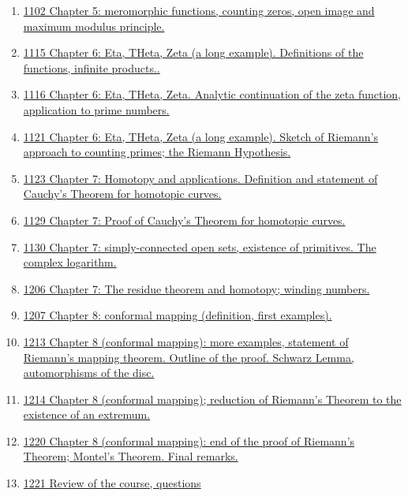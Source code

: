 \documentclass[11pt]{article}
\begin{document}
\begin{enumerate}
	\item \href{https://mp.weixin.qq.com/s/aFH-zaRn0azUI3CNPgEuQQ}{1102 Chapter 5: meromorphic functions, counting zeros, open image and maximum modulus principle.}	%
	\item \href{https://mp.weixin.qq.com/s/ZuEq6dt8PEbDHltJNAzlbg}{1115 Chapter 6: Eta, THeta, Zeta (a long example). Definitions of the functions, infinite products..}	%
	\item \href{https://mp.weixin.qq.com/s/nuNMmU-BuJDk5XAMP79Lig}{1116 Chapter 6: Eta, THeta, Zeta. Analytic continuation of the zeta function, application to prime numbers.}	%
	\item \href{https://mp.weixin.qq.com/s/WstldXh3U6M8XhSn-5lBGw}{1121 Chapter 6: Eta, THeta, Zeta (a long example). Sketch of Riemann's approach to counting primes; the Riemann Hypothesis.}	%
	\item \href{https://mp.weixin.qq.com/s/YR5GTfxuLrgHn_YMLweBKA}{1123 Chapter 7: Homotopy and applications. Definition and statement of Cauchy's Theorem for homotopic curves.}	%
	\item \href{https://mp.weixin.qq.com/s/2ITdXmiyfllA85h23RZdxg}{1129 Chapter 7: Proof of Cauchy's Theorem for homotopic curves.}	%
	\item \href{https://mp.weixin.qq.com/s/A9wQpp5YaIN_gIXFlcImdg}{1130 Chapter 7: simply-connected open sets, existence of primitives. The complex logarithm.}	%
	\item \href{https://mp.weixin.qq.com/s/QqsGD_ZDWPirzHfrX-GnrA}{1206 Chapter 7: The residue theorem and homotopy; winding numbers.}	%
	\item \href{https://mp.weixin.qq.com/s/HW9jjGv1vyn-mBE-LSd_jw}{1207 Chapter 8: conformal mapping (definition, first examples).}	%
	\item \href{https://mp.weixin.qq.com/s/dev3XnxlHSZZdNvpwEb-8g}{1213 Chapter 8 (conformal mapping): more examples, statement of Riemann's mapping theorem. Outline of the proof. Schwarz Lemma, automorphisms of the disc.}	%
	\item \href{https://mp.weixin.qq.com/s/NlzF36to98_gfQoRRlIKzw}{1214 Chapter 8 (conformal mapping); reduction of Riemann's Theorem to the existence of an extremum.}	%
	\item \href{https://mp.weixin.qq.com/s/LgPQ0s1PgyyKGURqw1VttA}{1220 Chapter 8 (conformal mapping): end of the proof of Riemann's Theorem; Montel's Theorem. Final remarks.}	%
	\item \href{https://mp.weixin.qq.com/s/LzErfVGsvDyah_1G3DSDug}{1221 Review of the course, questions}	%
\end{enumerate}
\end{document}
